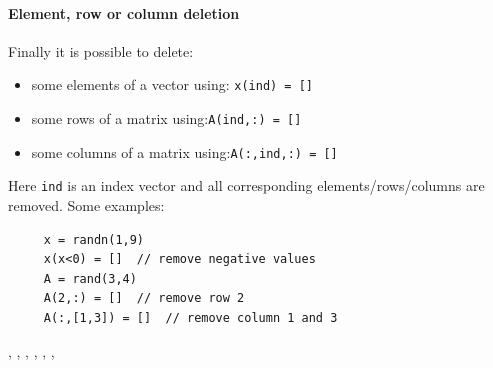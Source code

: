 \paragraph{Element, row or column deletion}

Finally it is possible to delete:
\begin{itemize}
\item some elements of a vector using: \verb+x(ind) = []+
\item some rows of a matrix using:\verb+A(ind,:) = []+  
\item some columns of a matrix using:\verb+A(:,ind,:) = []+ 
\end{itemize}
Here \verb+ind+ is an index vector and all corresponding elements/rows/columns are removed.
Some examples:
\begin{Verbatim}
     x = randn(1,9)
     x(x<0) = []  // remove negative values
     A = rand(3,4)
     A(2,:) = []  // remove row 2
     A(:,[1,3]) = []  // remove column 1 and 3
\end{Verbatim}




\begin{manseealso}
    , , , , , , 
\end{manseealso}
